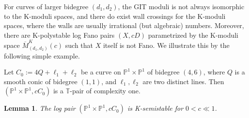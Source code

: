 \documentclass[a4paper,12pt]{amsart}
\newcommand{\ove}[1]{\overline{#1}}
\newcommand{\mtc}[1]{\mathcal{#1}}
\newcommand{\mts}[1]{\mathscr{#1}}
\DeclareMathOperator{\PGL}{PGL}
\DeclareMathOperator{\sst}{ss}
\newcommand{\bT}{{\mathbb T}}
\newcommand{\bP}{{\mathbb P}}
\newtheorem{lemma}[theorem]{Lemma}
\theoremstyle{definition}
\theoremstyle{remark}
\begin{document}

For curves of larger bidegree $(d_1,d_2)$, the GIT moduli is not always isomorphic to the K-moduli spaces, and there do exist wall crossings for the K-moduli spaces, where the walls are usually irrational (but algebraic) numbers. Moreover, there are K-polystable log Fano pairs $(X,cD)$ parametrized by the K-moduli space $\ove{M}^K_{(d_1,d_2)}(c)$ such that $X$ itself is not Fano. We illustrate this by the following simple example.


Let $C_0:=4Q+\ell_1+\ell_2$ be a curve on $\bP^1\times\bP^1$ of bidegree $(4,6)$, where $Q$ is a smooth conic of bidegree $(1,1)$, and $\ell_1,\ell_2$ are two distinct lines. Then $(\bP^1\times\bP^1,cC_0)$ is a $\bT$-pair of complexity one.

\begin{lemma}
    The log pair $(\bP^1\times\bP^1,cC_0)$ is K-semistable for $0<c\ll 1$.
\end{lemma}
\end{document}
